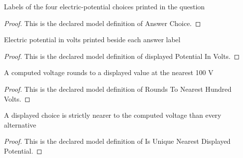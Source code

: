 \begin{definition}
  \label{def:physics:phyx-mini-0859:phyxminiproblems-problemphyxmini0859-answerchoice}
  Labels of the four electric-potential choices printed in the question
\end{definition}
\begin{proof}
  This is the declared model definition of Answer Choice.
\end{proof}
\begin{definition}
  \label{def:physics:phyx-mini-0859:phyxminiproblems-problemphyxmini0859-displayedpotentialinvolts}
  Electric potential in volts printed beside each answer label
\end{definition}
\begin{proof}
  This is the declared model definition of displayed Potential In Volts.
\end{proof}
\begin{definition}
  \label{def:physics:phyx-mini-0859:phyxminiproblems-problemphyxmini0859-roundstonearesthundredvolts}
  A computed voltage rounds to a displayed value at the nearest 100 V
\end{definition}
\begin{proof}
  This is the declared model definition of Rounds To Nearest Hundred Volts.
\end{proof}
\begin{definition}
  \label{def:physics:phyx-mini-0859:phyxminiproblems-problemphyxmini0859-isuniquenearestdisplayedpotential}
  A displayed choice is strictly nearer to the computed voltage than every alternative
\end{definition}
\begin{proof}
  This is the declared model definition of Is Unique Nearest Displayed Potential.
\end{proof}
